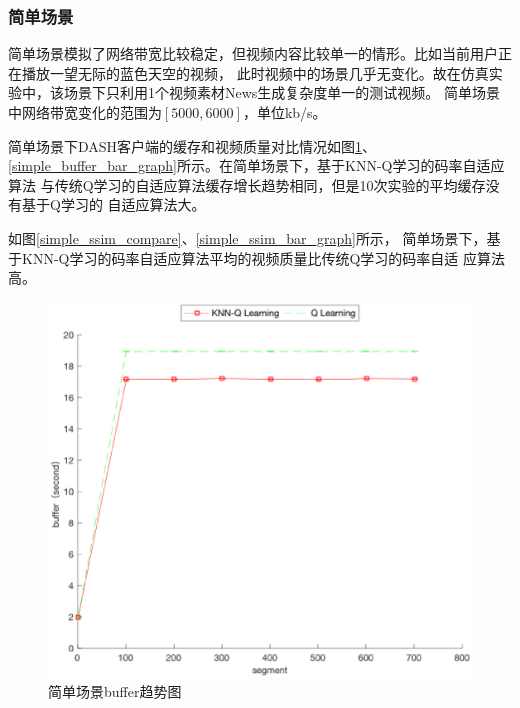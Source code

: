 \documentclass[twocolumn]{article}
\begin{document}
\subsubsection{简单场景}
简单场景模拟了网络带宽比较稳定，但视频内容比较单一的情形。比如当前用户正在播放一望无际的蓝色天空的视频，
此时视频中的场景几乎无变化。故在仿真实验中，该场景下只利用1个视频素材News生成复杂度单一的测试视频。
简单场景中网络带宽变化的范围为$\left[5000,6000\right]$，单位kb/s。

简单场景下DASH客户端的缓存和视频质量对比情况如图\ref{simple_buffer_compare}、
\ref{simple_buffer_bar_graph}所示。在简单场景下，基于KNN-Q学习的码率自适应算法
与传统Q学习的自适应算法缓存增长趋势相同，但是10次实验的平均缓存没有基于Q学习的
自适应算法大。

如图\ref{simple_ssim_compare}、\ref{simple_ssim_bar_graph}所示，
简单场景下，基于KNN-Q学习的码率自适应算法平均的视频质量比传统Q学习的码率自适
应算法高。
\begin{figure}[htbp]
\centering
\includegraphics[width=\columnwidth]{simple_buffer_compare}
\caption{简单场景buffer趋势图}
\label{simple_buffer_compare}
\end{figure}
\end{document}
